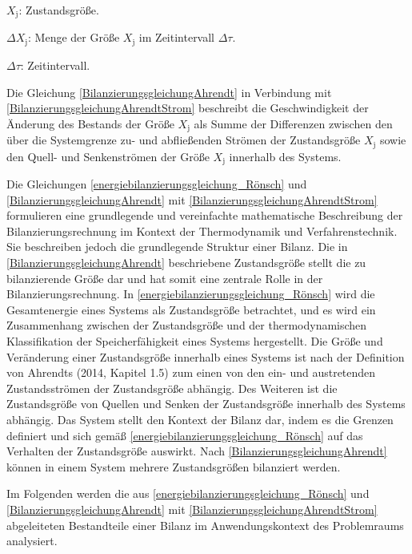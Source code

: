 \begin{description}
    \item \(X_{\text{j}}\): Zustandsgröße.
    \item \(\Delta X_{\text{j}}\): Menge der Größe \(X_{\text{j}}\) im Zeitintervall \(\Delta \tau\).
    \item \(\Delta \tau\): Zeitintervall.
\end{description}

Die Gleichung \eqref{BilanzierungsgleichungAhrendt} in Verbindung mit \eqref{BilanzierungsgleichungAhrendtStrom} beschreibt die Geschwindigkeit der Änderung des 
Bestands der Größe \(X_{\text{j}}\) als Summe der Differenzen zwischen den über die Systemgrenze zu- und abfließenden Strömen der Zustandsgröße 
\(X_{\text{j}}\) sowie den Quell- und Senkenströmen der Größe \(X_{\text{j}}\) innerhalb des Systems. 

Die Gleichungen \eqref{energiebilanzierungsgleichung_Rönsch} und \eqref{BilanzierungsgleichungAhrendt} mit \eqref{BilanzierungsgleichungAhrendtStrom} 
formulieren eine grundlegende und vereinfachte mathematische Beschreibung der Bilanzierungsrechnung im Kontext der Thermodynamik und Verfahrenstechnik. 
Sie beschreiben jedoch die grundlegende Struktur einer Bilanz. 
Die in \eqref{BilanzierungsgleichungAhrendt} beschriebene Zustandsgröße stellt die zu bilanzierende Größe dar und hat somit eine zentrale Rolle in der 
Bilanzierungsrechnung. In \eqref{energiebilanzierungsgleichung_Rönsch} wird die Gesamtenergie eines Systems als Zustandsgröße betrachtet, 
und es wird ein Zusammenhang zwischen der Zustandsgröße und der thermodynamischen Klassifikation der Speicherfähigkeit eines Systems hergestellt.
Die Größe und Veränderung einer Zustandsgröße innerhalb eines Systems ist nach der Definition von Ahrendts (2014, Kapitel 1.5) zum einen  
von den ein- und austretenden Zustandsströmen der Zustandsgröße abhängig. 
Des Weiteren ist die Zustandsgröße von Quellen und Senken der Zustandsgröße innerhalb des Systems abhängig.
Das System stellt den Kontext der Bilanz dar, indem es die Grenzen definiert und sich gemäß \eqref{energiebilanzierungsgleichung_Rönsch} auf das Verhalten der 
Zustandsgröße auswirkt. Nach \eqref{BilanzierungsgleichungAhrendt} können in einem System mehrere Zustandsgrößen bilanziert werden.

Im Folgenden werden die aus \eqref{energiebilanzierungsgleichung_Rönsch} und \eqref{BilanzierungsgleichungAhrendt} mit \eqref{BilanzierungsgleichungAhrendtStrom} 
abgeleiteten Bestandteile einer Bilanz im Anwendungskontext des Problemraums analysiert. 

